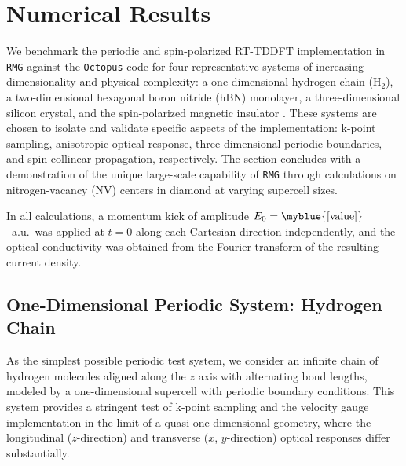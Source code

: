 
\section{Numerical Results}
\label{sec:results}

We benchmark the periodic and spin-polarized RT-TDDFT implementation
in \texttt{RMG} against the \texttt{Octopus} code\cite{octopus} for
four representative systems of increasing dimensionality and physical
complexity: a one-dimensional hydrogen chain (H$_2$), a
two-dimensional hexagonal boron nitride (hBN) monolayer, a
three-dimensional silicon crystal, and the spin-polarized magnetic
insulator .
These systems are chosen to isolate and validate specific aspects of
the implementation: k-point sampling, anisotropic optical response,
three-dimensional periodic boundaries, and spin-collinear propagation,
respectively.
The section concludes with a demonstration of the unique large-scale
capability of \texttt{RMG} through calculations on nitrogen-vacancy
(NV) centers in diamond at varying supercell sizes.

In all calculations, a momentum kick of amplitude $E_0 =
\myblue{[\mathrm{value}]}$~a.u.\ was applied at $t=0$ along each
Cartesian direction independently, and the optical conductivity
was obtained from the Fourier transform of the resulting current
density.

\subsection{One-Dimensional Periodic System: Hydrogen Chain}
\label{sec:h2}

As the simplest possible periodic test system, we consider an
infinite chain of hydrogen molecules aligned along the $z$ axis
with alternating bond lengths, modeled by a one-dimensional
supercell with periodic boundary conditions.
This system provides a stringent test of k-point sampling and the
velocity gauge implementation in the limit of a quasi-one-dimensional
geometry, where the longitudinal ($z$-direction) and transverse
($x$, $y$-direction) optical responses differ substantially.

